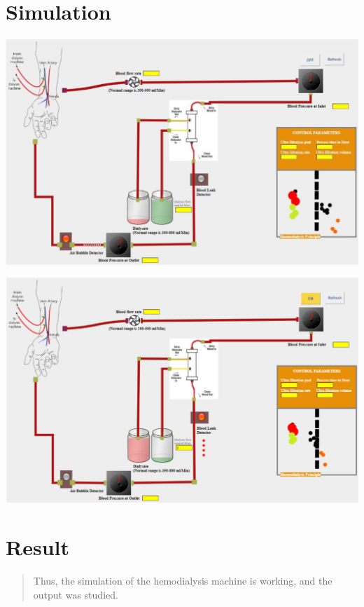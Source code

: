 \documentclass[
  11pt,
  letterpaper,
  DIV=11,
  numbers=noendperiod]{scrreprt}
\begin{document}
\section{Simulation}\label{simulation-3}

\includegraphics[width=6.04167in,height=\textheight]{images/clipboard-2890244601.png}

\includegraphics[width=6.01042in,height=\textheight]{images/clipboard-3169178804.png}

\section{Result}\label{result-8}

\begin{quote}
Thus, the simulation of the hemodialysis machine is working, and the
output was studied.
\end{quote}

\end{document}
